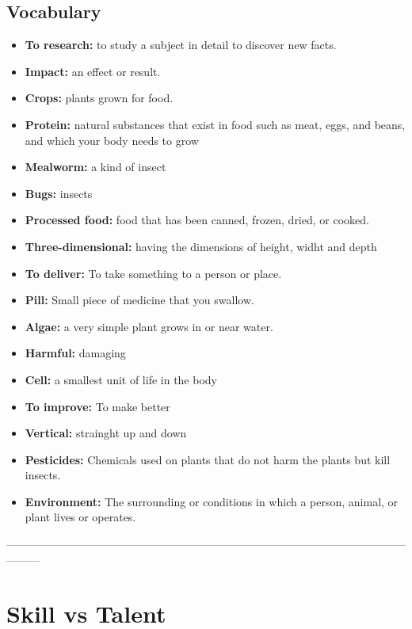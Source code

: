 \subsection{Vocabulary}
\begin{itemize}
    \item \textbf{To research:} to study a subject in detail to discover new facts.
    \item \textbf{Impact:} an effect or result.
    \item \textbf{Crops:} plants grown for food.
    \item \textbf{Protein:} natural substances that exist in food such as meat, eggs, and beans, and which your body needs to grow
    \item \textbf{Mealworm:} a kind of insect
    \item \textbf{Bugs:} insects
    \item \textbf{Processed food:} food that has been canned, frozen, dried, or cooked.
    \item \textbf{Three-dimensional:} having the dimensions of height, widht and depth
    \item \textbf{To deliver:} To take something to a person or place.
    \item \textbf{Pill:} Small piece of medicine that you swallow.
    \item \textbf{Algae:} a very simple plant grows in or near water.
    \item \textbf{Harmful:} damaging
    \item \textbf{Cell:} a smallest unit of life in the body
    \item \textbf{To improve:} To make better
    \item \textbf{Vertical:} strainght up and down
    \item \textbf{Pesticides:} Chemicals used on plants that do not harm the plants but kill insects.
    \item \textbf{Environment:} The surrounding or conditions in which a person, animal, or plant lives or operates.
\end{itemize}





---------------------------------------------------------------------------------------------------------------------

\section{Skill vs Talent}

